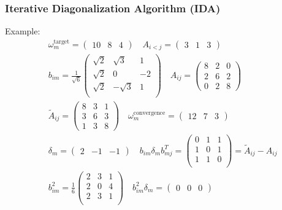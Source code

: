 \documentclass[10pt]{beamer}
\begin{document}
\begin{frame}
\frametitle{Iterative Diagonalization Algorithm (IDA)}
Example:
\begin{align*}
&\omega^{\mathrm{target}}_m =
\begin{pmatrix}
10 & 8 & 4
\end{pmatrix} \quad
A_{i<j} =
\begin{pmatrix}
3 & 1 & 3
\end{pmatrix} \\
&b_{im} =
\frac{1}{\sqrt{6}}
\begin{pmatrix}
\sqrt{2} & \sqrt{3} & 1 \\
\sqrt{2} & 0 & -2 \\
\sqrt{2} & -\sqrt{3} & 1 \\
\end{pmatrix} \quad
A_{ij} =
\begin{pmatrix}
8 & 2 & 0 \\
2 & 6 & 2 \\
0 & 2 & 8
\end{pmatrix} \\
&\tilde{A}_{ij} =
\begin{pmatrix}
8 & 3 & 1 \\
3 & 6 & 3 \\
1 & 3 & 8
\end{pmatrix} \quad
\omega^{\mathrm{convergence}}_m =
\begin{pmatrix}
12 & 7 & 3
\end{pmatrix} \\
&\delta_m =
\begin{pmatrix}
2 & -1 & -1
\end{pmatrix} \quad
b_{im} \delta_m b^T_{mj} =
\begin{pmatrix}
0 & 1 & 1 \\
1 & 0 & 1 \\
1 & 1 & 0 \\
\end{pmatrix}
= \tilde{A}_{ij} - A_{ij} \\
&b^2_{im} =
\frac{1}{6}
\begin{pmatrix}
2 & 3 & 1 \\
2 & 0 & 4 \\
2 & 3 & 1 \\
\end{pmatrix} \quad
b^2_{im} \delta_m =
\begin{pmatrix}
0 & 0 & 0
\end{pmatrix}
\end{align*}
\end{frame}
\end{document}

